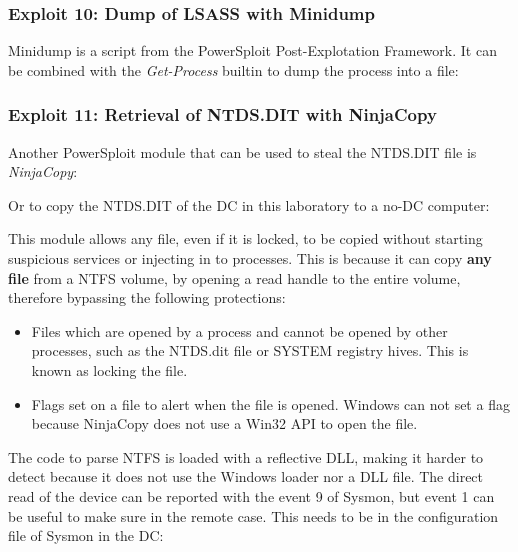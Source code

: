 \subsubsection{Exploit 10: Dump of LSASS with Minidump}
Minidump is a script from the PowerSploit Post-Explotation Framework\cite{powersploit}. It can be combined with the \textit{Get-Process} builtin to dump the process into a file:


\subsubsection{Exploit 11: Retrieval of NTDS.DIT with NinjaCopy} \label{invoke-NinjaCopy}
Another PowerSploit module that can be used to steal the NTDS.DIT file is \textit{NinjaCopy}:

\linej
Or to copy the NTDS.DIT of the DC in this laboratory to a no-DC computer:

\linej
This module allows any file, even if it is locked, to be copied without starting suspicious services or injecting in to processes. This is because it can copy \textbf{any file} from a NTFS volume, by opening a read handle to the entire volume, therefore bypassing the following protections\cite{dump_ways}:
\begin{itemize}
	\item Files which are opened by a process and cannot be opened by other processes, such as the NTDS.dit file or SYSTEM registry hives. This is known as locking the file.
	\item Flags set on a file to alert when the file is opened. Windows can not set a flag because NinjaCopy does not use a Win32 API to open the file.
\end{itemize}
\linej
The code to parse NTFS is loaded with a reflective DLL, making it harder to detect because it does not use the Windows loader nor a DLL file.
\linej
The direct read of the device can be reported with the event 9 of Sysmon, but event 1 can be useful to make sure in the remote case. This needs to be in the configuration file of Sysmon in the DC:

\linej

